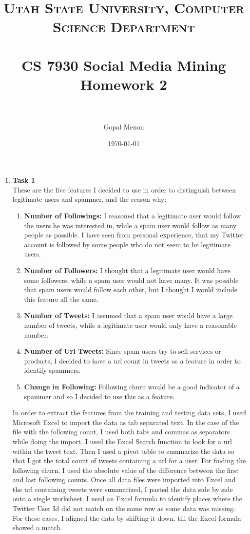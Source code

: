 \documentclass[paper=a4, fontsize=11pt]{scrartcl} %
\title{	
\normalfont \normalsize 
\textsc{Utah State University, Computer Science Department} \\ [25pt] %
\horrule{0.5pt} \\[0.4cm] %
\huge CS 7930 Social Media Mining\\Homework 2\\ %
\horrule{2pt} \\[0.5cm] %
}
\author{Gopal Menon} %
\date{\normalsize\today} %
\numberwithin{equation}{section} %
\numberwithin{figure}{section} %
\numberwithin{table}{section} %
\begin{document}
\maketitle %

\begin{enumerate}

\item \textbf{Task 1} \\
These are the five features I decided to use in order to distinguish between legitimate users and spammer, and the reason why:

\begin{enumerate}

\item \textbf{Number of Followings:} I reasoned that a legitimate user would follow the users he was interested in, while a spam user would follow as many people as possible. I have seen from personal experience, that my Twitter account is followed by some people who do not seem to be legitimate users.

\item \textbf{Number of Followers:} I thought that a legitimate user would have some followers, while a spam user would not have many. It was possible that spam users would follow each other, but I thought I would include this feature all the same.

\item \textbf{Number of Tweets:} I assumed that a spam user would have a large number of tweets, while a legitimate user would only have a reasonable number.

\item \textbf{Number of Url Tweets:} Since spam users try to sell services or products, I decided to have a url count in tweets as a feature in order to identify spammers.

\item \textbf{Change in Following:} Following churn would be a good indicator of a spammer and so I decided to use this as a feature.

\end{enumerate}

In order to extract the features from the training and testing data sets, I used Microsoft Excel to import the data as tab separated text. In the case of the file with the following count, I used both tabs and commas as separators while doing the import. I used the Excel Search function to look for a url within the tweet text. Then I used a pivot table to summarize the data so that I got the total count of tweets containing a url for a user. For finding the following churn, I used the absolute value of the difference between the first and last following counts. Once all data files were imported into Excel and the url containing tweets were summarized, I pasted the data side by side onto a single worksheet. I used an Excel formula to identify places where the Twitter User Id did not match on the same row as some data was missing. For these cases, I aligned the data by shifting it down, till the Excel formula showed a match. 


\end{enumerate}
\end{document}
